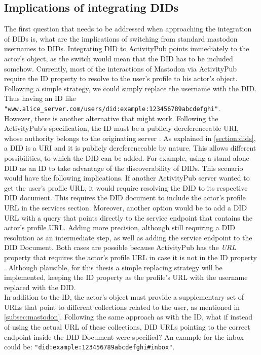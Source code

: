 \subsection{Implications of integrating DIDs}
The first question that needs to be addressed when approaching the integration of DIDs is, what are the implications of switching from standard mastodon usernames to DIDs. Integrating DID to ActivityPub points immediately to the actor's object, as the switch would mean that the DID has to be included somehow. Currently, most of the interactions of Mastodon via ActivityPub require the ID property to resolve to the user's profile to his actor's object. Following a simple strategy, we could simply replace the username with the DID. Thus having an ID like \verb|"www.alice_server.com/users/did:example:123456789abcdefghi"|.\\
However, there is another alternative that might work. Following the ActivityPub's specification, the ID must be a publicly dereferenceable URI, whose authority belongs to the originating server \cite{lemmer-webber_tallon_guy_prodromou_2018}. As explained in \autoref{section:dids}, a DID is a URI and it is publicly dereferenceable by nature. This allows different possibilities, to which the DID can be added. For example, using a stand-alone DID as an ID to take advantage of the discoverability of DIDs. This scenario would have the following implications. If another ActivityPub server wanted to get the user's profile URL, it would require resolving the DID to its respective DID document. This requires the DID document to include the actor's profile URL in the services section. Moreover, another option would be to add a DID URL with a query that points directly to the service endpoint that contains the actor's profile URL. Adding more precision, although still requiring a DID resolution as an intermediate step, as well as adding the service endpoint to the DID Document. Both cases are possible because ActivityPub has the \emph{URL} property that requires the actor's profile URL in case it is not in the ID property \cite{lemmer-webber_tallon_guy_prodromou_2018}. Although plausible, for this thesis a simple replacing strategy will be implemented, keeping the ID property as the profile's URL with the username replaced with the DID. \\
In addition to the ID, the actor's object must provide a supplementary set of URLs that point to different collections related to the user, as mentioned in \autoref{subsec:mastodon}. Following the same approach as with the ID, what if instead of using the actual URL of these collections, DID URLs pointing to the correct endpoint inside the DID Document were specified? An example for the inbox could be: \verb|"did:example:123456789abcdefghi#inbox"|.

